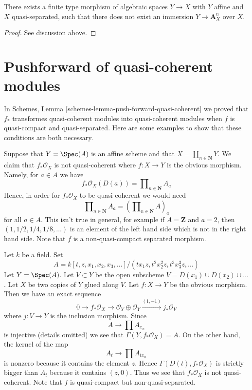 \begin{lemma}
\label{lemma-cannot-embed-into-affine}
There exists a finite type morphism of algebraic spaces $Y \to X$
with $Y$ affine and $X$ quasi-separated, such that there does not exist
an immersion $Y \to \mathbf{A}^n_X$ over $X$.
\end{lemma}

\begin{proof}
See discussion above.
\end{proof}










\section{Pushforward of quasi-coherent modules}
\label{section-push-quasi-coherent}

\noindent
In Schemes, Lemma \ref{schemes-lemma-push-forward-quasi-coherent}
we proved that $f_*$ transformes quasi-coherent modules into quasi-coherent
modules when $f$ is quasi-compact and quasi-separated. Here are some
examples to show that these conditions are both necessary.

\medskip\noindent
Suppose that $Y = \Spec(A)$ is an affine scheme and that
$X = \coprod_{n \in \mathbf{N}} Y$. We claim that $f_*\mathcal{O}_X$
is not quasi-coherent where $f : X \to Y$ is the obvious morphism.
Namely, for $a \in A$ we have
$$
f_*\mathcal{O}_X(D(a)) = \prod\nolimits_{n \in \mathbf{N}} A_a
$$
Hence, in order for $f_*\mathcal{O}_X$ to be quasi-coherent we would need
$$
\prod\nolimits_{n \in \mathbf{N}} A_a
=
\left(\prod\nolimits_{n \in \mathbf{N}} A\right)_a
$$
for all $a \in A$. This isn't true in general, for example if
$A = \mathbf{Z}$ and $a = 2$, then $(1, 1/2, 1/4, 1/8, \ldots)$
is an element of the left hand side which is not in the right hand side.
Note that $f$ is a non-quasi-compact separated morphism.

\medskip\noindent
Let $k$ be a field. Set
$$
A = k[t, z, x_1, x_2, x_3, \ldots]/(tx_1z, t^2x_2^2z, t^3x_3^3z, \ldots)
$$
Let $Y = \Spec(A)$. Let $V \subset Y$ be the open subscheme
$V = D(x_1) \cup D(x_2) \cup \ldots$. Let $X$ be two copies of $Y$
glued along $V$. Let $f : X \to Y$ be the obvious morphism. Then we
have an exact sequence
$$
0 \to f_*\mathcal{O}_X \to
\mathcal{O}_Y \oplus \mathcal{O}_Y \xrightarrow{(1, -1)} j_*\mathcal{O}_V
$$
where $j : V \to Y$ is the inclusion morphism. Since
$$
A \longrightarrow \prod A_{x_n}
$$
is injective (details omitted) we see that $\Gamma(Y, f_*\mathcal{O}_X) = A$.
On the other hand, the kernel of the map
$$
A_t \longrightarrow \prod A_{tx_n}
$$
is nonzero because it contains the element $z$. Hence
$\Gamma(D(t), f_*\mathcal{O}_X)$ is strictly bigger than
$A_t$ because it contains $(z, 0)$. Thus we see that $f_*\mathcal{O}_X$
is not quasi-coherent. Note that $f$ is quasi-compact but
non-quasi-separated.

